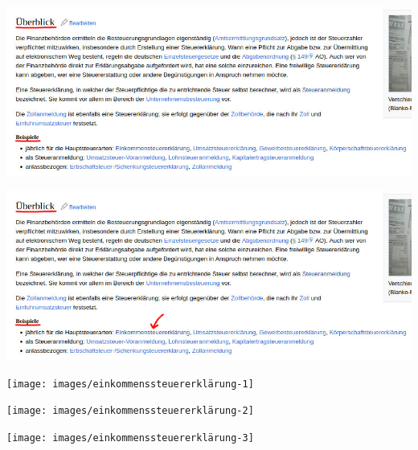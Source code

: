 \documentclass[draft]{beamer}
\begin{document}
		{
		\begin{frame}[plain]
			\begin{center}
				\includegraphics[width=\linewidth]{images/steuererklärung-überblick-1}
			\end{center}
		\end{frame}
		\begin{frame}[plain]
			\begin{center}
				\includegraphics[width=\linewidth]{images/steuererklärung-überblick-2}
			\end{center}
		\end{frame}
		\begin{frame}[plain]
			\begin{center}
				\texttt{[image: images/einkommenssteuererklärung-1]}
			\end{center}
		\end{frame}
		\begin{frame}[plain]
			\begin{center}
				\texttt{[image: images/einkommenssteuererklärung-2]}
			\end{center}
		\end{frame}
		\begin{frame}[plain]
			\begin{center}
				\texttt{[image: images/einkommenssteuererklärung-3]}
			\end{center}
		\end{frame}
		}
\end{document}
